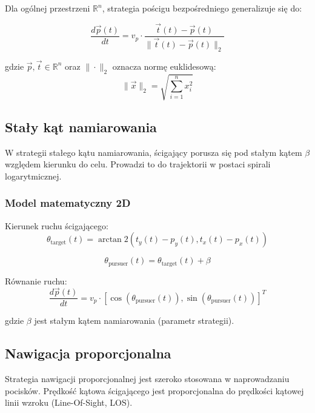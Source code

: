 \documentclass[12pt,a4paper]{article}
\begin{document}
Dla ogólnej przestrzeni $\mathbb{R}^n$, strategia pościgu bezpośredniego generalizuje się do:

\begin{equation}
\frac{d\vec{p}(t)}{dt} = v_p \cdot \frac{\vec{t}(t) - \vec{p}(t)}{\|\vec{t}(t) - \vec{p}(t)\|_2}
\end{equation}

gdzie $\vec{p}, \vec{t} \in \mathbb{R}^n$ oraz $\|\cdot\|_2$ oznacza normę euklidesową:
\begin{equation}
\|\vec{x}\|_2 = \sqrt{\sum_{i=1}^{n} x_i^2}
\end{equation}

\subsection{Stały kąt namiarowania}

W strategii stałego kątu namiarowania, ścigający porusza się pod stałym kątem $\beta$ względem kierunku do celu. Prowadzi to do trajektorii w postaci spirali logarytmicznej.

\subsubsection{Model matematyczny 2D}

Kierunek ruchu ścigającego:
\begin{equation}
\theta_{\text{target}}(t) = \arctan2(t_y(t) - p_y(t), t_x(t) - p_x(t))
\end{equation}

\begin{equation}
\theta_{\text{pursuer}}(t) = \theta_{\text{target}}(t) + \beta
\end{equation}

Równanie ruchu:
\begin{equation}
\frac{d\vec{p}(t)}{dt} = v_p \cdot [\cos(\theta_{\text{pursuer}}(t)), \sin(\theta_{\text{pursuer}}(t))]^T
\end{equation}

gdzie $\beta$ jest stałym kątem namiarowania (parametr strategii).

\subsection{Nawigacja proporcjonalna}

Strategia nawigacji proporcjonalnej jest szeroko stosowana w naprowadzaniu pocisków. Prędkość kątowa ścigającego jest proporcjonalna do prędkości kątowej linii wzroku (Line-Of-Sight, LOS).
\end{document}
